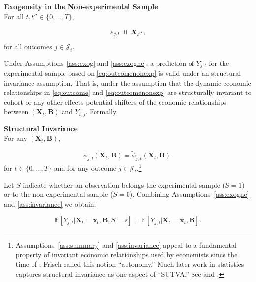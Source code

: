 \begin{assumption}\label{ass:exogne} \textbf{Exogeneity in the Non-experimental Sample}\\
For all $t, t'' \in \{ 0, \ldots, T \}$,

\begin{equation}
\varepsilon_{j,t} \perp\!\!\!\perp \bm{X}_{t^{''}},
\end{equation}
\noindent for all outcomes $j \in \mathcal{J}_{t}$.
\end{assumption}

\noindent Under Assumptions~\ref{ass:exog} and \ref{ass:exogne}, a prediction of $Y_{j,t}$ for the experimental sample based on \eqref{eq:outcomenonexp} is valid under an structural invariance assumption. That is, under the assumption that the dynamic economic relationships in \eqref{eq:outcome} and \eqref{eq:outcomenonexp} are structurally invariant to cohort or any other effects potential shifters of the economic relationships between $\left( \bm{X}_{t}, \bm{B} \right)$ and $Y_{t,j}$. Formally, 

\onehalfspacing
\begin{assumption} \textbf{Structural Invariance} \label{ass:invariance} \\
\noindent For any  $\left( \bm{X}_{t}, \bm{B} \right)$,

\begin{equation}
\phi_{j,t} \left( \bm{X}_{t}, \bm{B} \right) = \widetilde{\phi}_{j,t} \left( \bm{X}_{t}, \bm{B} \right).
\end{equation}
\noindent for $t \in \{ 0, \ldots, T \}$ and for any outcome $j \in \mathcal{J}_{t}$.\footnote{Assumptions~\ref{ass:summary} and \ref{ass:invariance} appeal to a fundamental property of invariant economic relationships used by economists since the time of \citet{Frisch_1938_autonomy}. Frisch called this notion ``autonomy.'' Much later work in statistics captures structural invariance as one aspect of ``SUTVA.'' See \citet{Holland_1986_JASA} and \citet{Heckman_2008_ISR}.}
\end{assumption}
\doublespacing

\noindent Let $S$ indicate whether an observation belongs the experimental sample ($S = 1$) or to the non-experimental sample ($S = 0$). Combining Assumptions~\ref{ass:exogne} and \ref{ass:invariance} we obtain: 

\begin{equation}
\mathbb{E} \left[ Y_{j,t} | \bm{X}_{t} = \bm{x}_{t}, \bm{B}, S = s \right] = \mathbb{E} \left[ Y_{j,t} | \bm{X}_{t} = \bm{x}_{t}, \bm{B} \right]. \label{eq:withbetimplication}
\end{equation}

